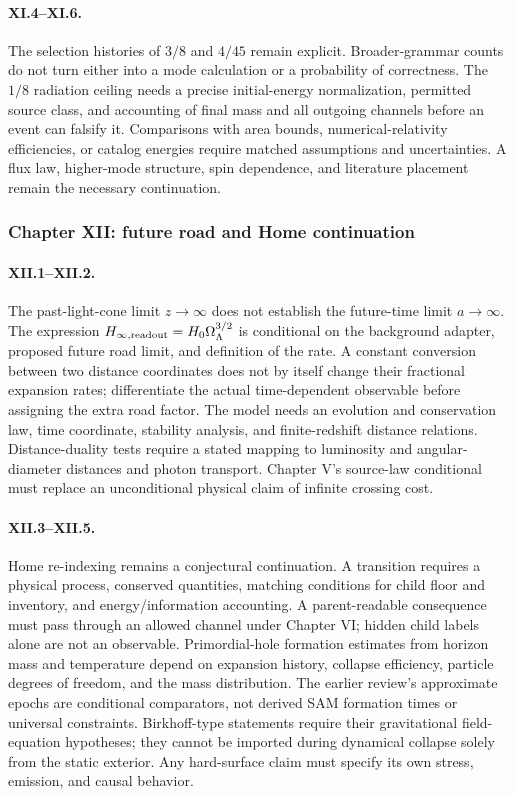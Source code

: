 \paragraph{XI.4--XI.6.}
The selection histories of $3/8$ and $4/45$ remain explicit. Broader-grammar counts do not turn either into a mode calculation or a probability of correctness. The $1/8$ radiation ceiling needs a precise initial-energy normalization, permitted source class, and accounting of final mass and all outgoing channels before an event can falsify it. Comparisons with area bounds, numerical-relativity efficiencies, or catalog energies require matched assumptions and uncertainties. A flux law, higher-mode structure, spin dependence, and literature placement remain the necessary continuation.

\subsubsection*{Chapter XII: future road and Home continuation}

\paragraph{XII.1--XII.2.}
The past-light-cone limit $z\to\infty$ does not establish the future-time limit $a\to\infty$. The expression $H_{\infty,\rm readout}=H_0\Omega_\Lambda^{3/2}$ is conditional on the background adapter, proposed future road limit, and definition of the rate. A constant conversion between two distance coordinates does not by itself change their fractional expansion rates; differentiate the actual time-dependent observable before assigning the extra road factor. The model needs an evolution and conservation law, time coordinate, stability analysis, and finite-redshift distance relations. Distance-duality tests require a stated mapping to luminosity and angular-diameter distances and photon transport. Chapter V's source-law conditional must replace an unconditional physical claim of infinite crossing cost.

\paragraph{XII.3--XII.5.}
Home re-indexing remains a conjectural continuation. A transition requires a physical process, conserved quantities, matching conditions for child floor and inventory, and energy/information accounting. A parent-readable consequence must pass through an allowed channel under Chapter VI; hidden child labels alone are not an observable. Primordial-hole formation estimates from horizon mass and temperature depend on expansion history, collapse efficiency, particle degrees of freedom, and the mass distribution. The earlier review's approximate epochs are conditional comparators, not derived SAM formation times or universal constraints. Birkhoff-type statements require their gravitational field-equation hypotheses; they cannot be imported during dynamical collapse solely from the static exterior. Any hard-surface claim must specify its own stress, emission, and causal behavior.

